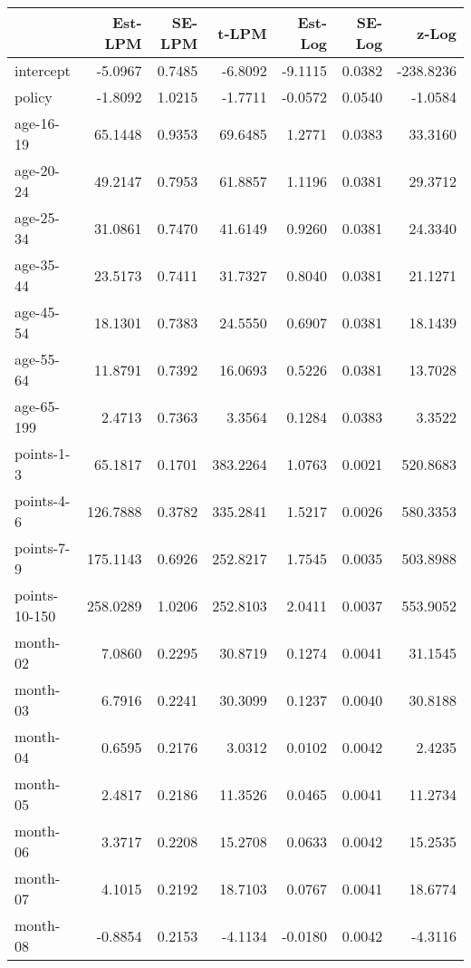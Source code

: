 \documentclass[10pt]{article}
\begin{document}

\begin{table}[ht]
\centering
\begin{tabular}{lrrrrrr}
  \hline
 & Est-LPM & SE-LPM & t-LPM & Est-Log & SE-Log & z-Log \\ 
  \hline
intercept & -5.0967 & 0.7485 & -6.8092 & -9.1115 & 0.0382 & -238.8236 \\ 
  policy & -1.8092 & 1.0215 & -1.7711 & -0.0572 & 0.0540 & -1.0584 \\ 
  age-16-19 & 65.1448 & 0.9353 & 69.6485 & 1.2771 & 0.0383 & 33.3160 \\ 
  age-20-24 & 49.2147 & 0.7953 & 61.8857 & 1.1196 & 0.0381 & 29.3712 \\ 
  age-25-34 & 31.0861 & 0.7470 & 41.6149 & 0.9260 & 0.0381 & 24.3340 \\ 
  age-35-44 & 23.5173 & 0.7411 & 31.7327 & 0.8040 & 0.0381 & 21.1271 \\ 
  age-45-54 & 18.1301 & 0.7383 & 24.5550 & 0.6907 & 0.0381 & 18.1439 \\ 
  age-55-64 & 11.8791 & 0.7392 & 16.0693 & 0.5226 & 0.0381 & 13.7028 \\ 
  age-65-199 & 2.4713 & 0.7363 & 3.3564 & 0.1284 & 0.0383 & 3.3522 \\ 
  points-1-3 & 65.1817 & 0.1701 & 383.2264 & 1.0763 & 0.0021 & 520.8683 \\ 
  points-4-6 & 126.7888 & 0.3782 & 335.2841 & 1.5217 & 0.0026 & 580.3353 \\ 
  points-7-9 & 175.1143 & 0.6926 & 252.8217 & 1.7545 & 0.0035 & 503.8988 \\ 
  points-10-150 & 258.0289 & 1.0206 & 252.8103 & 2.0411 & 0.0037 & 553.9052 \\ 
  month-02 & 7.0860 & 0.2295 & 30.8719 & 0.1274 & 0.0041 & 31.1545 \\ 
  month-03 & 6.7916 & 0.2241 & 30.3099 & 0.1237 & 0.0040 & 30.8188 \\ 
  month-04 & 0.6595 & 0.2176 & 3.0312 & 0.0102 & 0.0042 & 2.4235 \\ 
  month-05 & 2.4817 & 0.2186 & 11.3526 & 0.0465 & 0.0041 & 11.2734 \\ 
  month-06 & 3.3717 & 0.2208 & 15.2708 & 0.0633 & 0.0042 & 15.2535 \\ 
  month-07 & 4.1015 & 0.2192 & 18.7103 & 0.0767 & 0.0041 & 18.6774 \\ 
  month-08 & -0.8854 & 0.2153 & -4.1134 & -0.0180 & 0.0042 & -4.3116 \\ 

\end{tabular}
\end{table}
\end{document}
